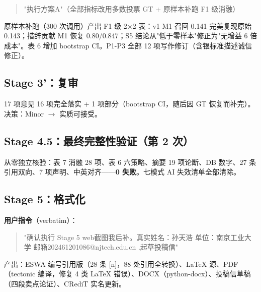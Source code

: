 \documentclass[11pt]{article}
\begin{document}
\begin{quote}"{\cjkfont 执行方案}A"{\cjkfont （全部指标改用多数投票} GT + {\cjkfont 原样本补跑} F1 {\cjkfont 级消融）}\end{quote}

{\cjkfont 原样本补跑（}300 {\cjkfont 次调用）产出} F1 {\cjkfont 级} 2$\times$2 {\cjkfont 表：}v1 M1 {\cjkfont 召回} 0.141 {\cjkfont 完美复现原始} 0.143{\cjkfont ；措辞贡献} M1 {\cjkfont 恢复} 0.80/0.847{\cjkfont ；}S5 {\cjkfont 结论从}"{\cjkfont 低于零样本}"{\cjkfont 修正为}"{\cjkfont 无增益} 6 {\cjkfont 倍成本}"{\cjkfont 。表} 6 {\cjkfont 增加} bootstrap CI{\cjkfont 。}P1-P3 {\cjkfont 全部} 12 {\cjkfont 项写作修订（含银标准描述诚信修正）。}

\subsection{Stage 3'{\cjkfont ：复审}}
17 {\cjkfont 项意见} 16 {\cjkfont 项完全落实} + 1 {\cjkfont 项部分（}bootstrap CI{\cjkfont ，随后因} GT {\cjkfont 恢复而补完）。决策：}Minor $\rightarrow$ {\cjkfont 实质可接受。}

\subsection{Stage 4.5{\cjkfont ：最终完整性验证（第} 2 {\cjkfont 次）}}
{\cjkfont 从零独立核验：表} 7 {\cjkfont 消融} 28 {\cjkfont 项、表} 6 {\cjkfont 六策略、摘要} 19 {\cjkfont 项论断、}DB {\cjkfont 数字、}27 {\cjkfont 条引用双向、}7 {\cjkfont 项声明、中英对齐}------\textbf{0 {\cjkfont 失败}}{\cjkfont 。七模式} AI {\cjkfont 失效清单全部清除。}

\subsection{Stage 5{\cjkfont ：格式化}}
\textbf{{\cjkfont 用户指令}}{\cjkfont （}verbatim{\cjkfont ）：}

\begin{quote}"{\cjkfont 确认执行} Stage 5 web{\cjkfont 截图我后补。真实姓名：孙天浩} {\cjkfont 单位：南京工业大学} {\cjkfont 邮箱}202461201086@njtech.edu.cn .{\cjkfont 起草投稿信}"\end{quote}

{\cjkfont 产出：}ESWA {\cjkfont 编号引用版（}28 {\cjkfont 条} [n]{\cjkfont ，}88 {\cjkfont 处引用全转换）、}LaTeX {\cjkfont 源、}PDF{\cjkfont （}tectonic {\cjkfont 编译，修复} 4 {\cjkfont 类} LaTeX {\cjkfont 错误）、}DOCX{\cjkfont （}python-docx{\cjkfont ）、投稿信草稿（四段卖点论证）、}CRediT {\cjkfont 实名更新。}
\end{document}
